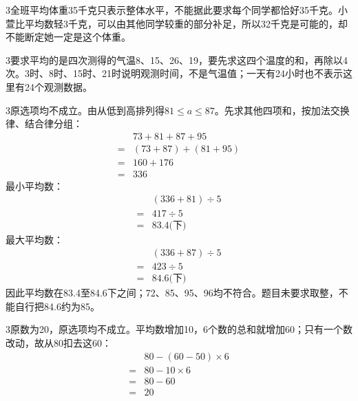 \documentclass[multi=snippet,border={5bp 20bp 5bp 5bp}]{standalone}
\newenvironment{snippet}[3]{\begin{minipage}{#1bp}\color{answerred}\fontsize{#2}{#3}\selectfont\raggedright}{\end{minipage}}
\begin{document}
\begin{snippet}{505}{11.5}{14}\begin{multicols}{3}\raggedcolumns 全班平均体重35千克只表示整体水平，不能据此要求每个同学都恰好35千克。小萱比平均数轻3千克，可以由其他同学较重的部分补足，所以32千克是可能的，却不能断定她一定是这个体重。\end{multicols}\end{snippet}
\begin{snippet}{505}{11.5}{14}\begin{multicols}{3}\raggedcolumns 要求平均的是四次测得的气温8、15、26、19，要先求这四个温度的和，再除以4次。3时、8时、15时、21时说明观测时间，不是气温值；一天有24小时也不表示这里有24个观测数据。\end{multicols}\end{snippet}
\begin{snippet}{505}{11.5}{14}\begin{multicols}{3}\raggedcolumns 原选项均不成立。由从低到高排列得\(81\le a\le87\)\allowbreak 。先求其他四项和，按加法交换律、结合律分组：\[\begin{aligned}&73+81+87+95\\={}&(73+87)+(81+95)\\={}&160+176\\={}&336\end{aligned}\]最小平均数：\[\begin{aligned}&(336+81)\div5\\={}&417\div5\\={}&83.4\text{(下)}\end{aligned}\]最大平均数：\[\begin{aligned}&(336+87)\div5\\={}&423\div5\\={}&84.6\text{(下)}\end{aligned}\]因此平均数在83.4至84.6下之间；72、85、95、96均不符合。题目未要求取整，不能自行把84.6约为85。\end{multicols}\end{snippet}
\begin{snippet}{505}{11.5}{14}\begin{multicols}{3}\raggedcolumns 原数为20，原选项均不成立。平均数增加10，6个数的总和就增加60；只有一个数改动，故从80扣去这60：\[\begin{aligned}&80-(60-50)\times6\\={}&80-10\times6\\={}&80-60\\={}&20\end{aligned}\]\end{multicols}\end{snippet}
\end{document}
